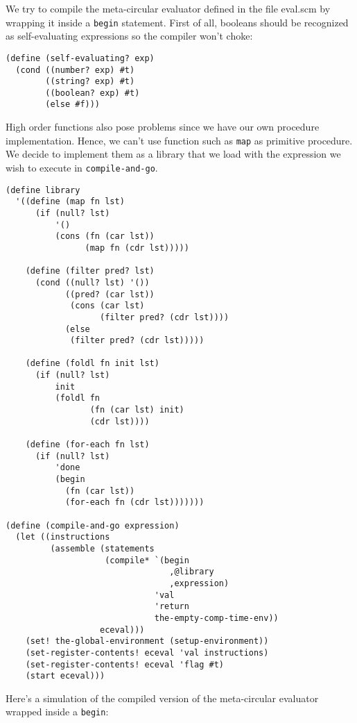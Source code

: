 \documentclass[a4paper,12pt]{article}
\begin{document}
We try to compile the meta-circular evaluator defined in the file
eval.scm by wrapping it inside a \lstinline!begin! statement.  First
of all, booleans should be recognized  as self-evaluating expressions
so the compiler won't choke:
\begin{lstlisting}
(define (self-evaluating? exp)
  (cond ((number? exp) #t)
        ((string? exp) #t)
        ((boolean? exp) #t)
        (else #f)))
\end{lstlisting}

High order functions also pose problems since we have our own
procedure implementation.  Hence, we can't use function such as
\lstinline!map! as primitive procedure.  We decide to implement them
as a library that we load with the expression we wish to execute in
\lstinline!compile-and-go!.

\begin{lstlisting}
(define library
  '((define (map fn lst)
      (if (null? lst)
          '()
          (cons (fn (car lst))
                (map fn (cdr lst)))))

    (define (filter pred? lst)
      (cond ((null? lst) '())
            ((pred? (car lst))
             (cons (car lst)
                   (filter pred? (cdr lst))))
            (else
             (filter pred? (cdr lst)))))

    (define (foldl fn init lst)
      (if (null? lst)
          init
          (foldl fn
                 (fn (car lst) init)
                 (cdr lst))))

    (define (for-each fn lst)
      (if (null? lst)
          'done
          (begin
            (fn (car lst))
            (for-each fn (cdr lst)))))))

(define (compile-and-go expression)
  (let ((instructions
         (assemble (statements
                    (compile* `(begin
                                 ,@library
                                 ,expression)
                              'val
                              'return
                              the-empty-comp-time-env))
                   eceval)))
    (set! the-global-environment (setup-environment))
    (set-register-contents! eceval 'val instructions)
    (set-register-contents! eceval 'flag #t)
    (start eceval)))
\end{lstlisting}

Here's a simulation of the compiled version of the meta-circular
evaluator wrapped inside a \lstinline!begin!:
\end{document}
